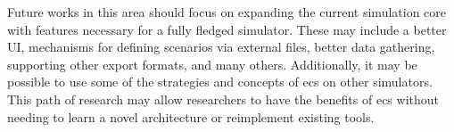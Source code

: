 \documentclass[twoside, 11pt]{article}
\begin{document}
Future works in this area should focus on expanding the current simulation core with features necessary for a fully fledged simulator. These may include a better UI, mechanisms for defining scenarios via external files, better data gathering, supporting other export formats, and many others. Additionally, it may be possible to use some of the strategies and concepts of \gls{ecs} on other simulators. This path of research may allow researchers to have the benefits of \gls{ecs} without needing to learn a  novel architecture or reimplement existing tools.

\printbibliography
\end{document}
